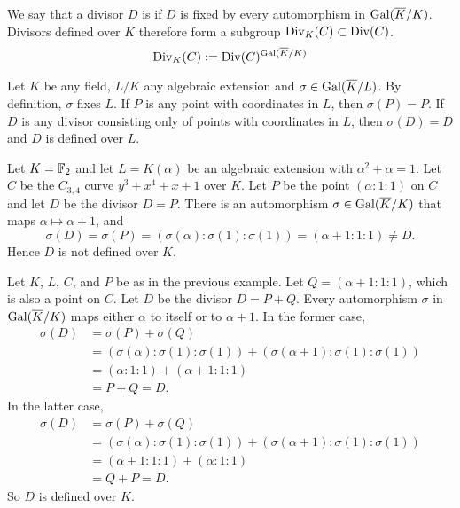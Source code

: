 We say that a divisor $D$ is  if $D$ is fixed by every automorphism in $\operatorname{Gal}(\overline K/K)$.
Divisors defined over $K$ therefore form a subgroup $\operatorname{Div}_K(C) \subset \operatorname{Div}(C)$.
  \[ \operatorname{Div}_K(C) := \operatorname{Div}(C)^{\operatorname{Gal}(\overline K/K)} \]

\begin{example}
  Let $K$ be any field, $L/K$ any algebraic extension and $\sigma \in \operatorname{Gal}(\overline K/L)$.
  By definition, $\sigma$ fixes $L$.
  If $P$ is any point with coordinates in $L$, then $\sigma(P) = P$.
  If $D$ is any divisor consisting only of points with coordinates in $L$, then $\sigma(D) = D$ and $D$ is defined over $L$.
\end{example}
\begin{example}
  Let $K = \mathbb{F}_2$ and let $L = K(\alpha)$ be an algebraic extension with $\alpha^2 + \alpha = 1$.
  Let $C$ be the $C_{3,4}$ curve $y^3 + x^4 + x + 1$ over $K$.
  Let $P$ be the point $(\alpha : 1 : 1)$ on $C$ and let $D$ be the divisor $D = P$.
  There is an automorphism $\sigma \in \operatorname{Gal}(\overline K/K)$ that maps $\alpha \mapsto \alpha + 1$, and
    \[ \sigma(D) = \sigma(P) = (\sigma(\alpha) : \sigma(1) : \sigma(1)) = (\alpha + 1 : 1 : 1) \neq D. \]
  Hence $D$ is not defined over $K$.
\end{example}
\begin{example}
  Let $K$, $L$, $C$, and $P$ be as in the previous example.
  Let $Q = (\alpha + 1 : 1 : 1)$, which is also a point on $C$.
  Let $D$ be the divisor $D = P + Q$.
  Every automorphism $\sigma$ in $\operatorname{Gal}(\overline K/K)$ maps either $\alpha$ to itself or to $\alpha + 1$.
  In the former case,
  \begin{align*}
    \sigma(D) &= \sigma(P) + \sigma(Q) \\
              &= (\sigma(\alpha) : \sigma(1) : \sigma(1)) + (\sigma(\alpha + 1) : \sigma(1) : \sigma(1)) \\
              &= (\alpha : 1 : 1) + (\alpha + 1 : 1 : 1) \\
              &= P + Q = D.
  \end{align*}
  In the latter case,
  \begin{align*}
    \sigma(D) &= \sigma(P) + \sigma(Q) \\
              &= (\sigma(\alpha) : \sigma(1) : \sigma(1)) + (\sigma(\alpha + 1) : \sigma(1) : \sigma(1)) \\
              &= (\alpha + 1 : 1 : 1) + (\alpha : 1 : 1) \\
              &= Q + P = D.
  \end{align*}
  So $D$ is defined over $K$.
\end{example}

